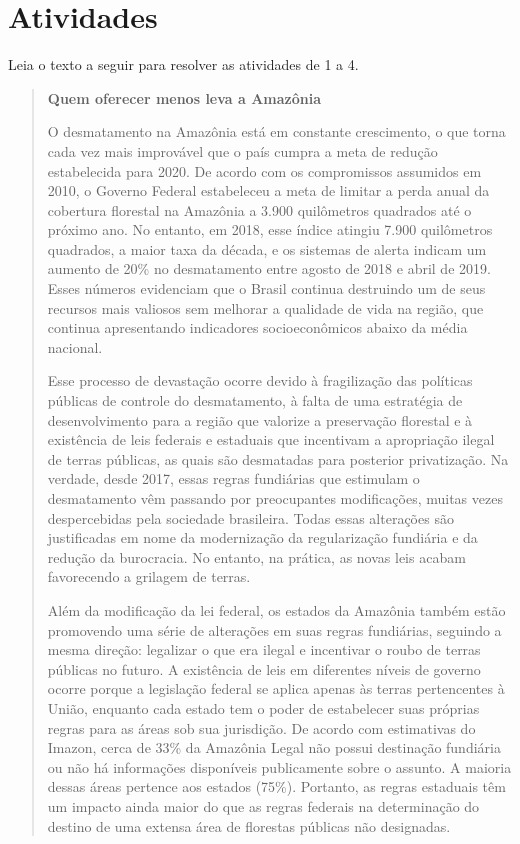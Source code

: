 \section{Atividades}

Leia o texto a seguir para resolver as atividades de 1 a 4.

\begin{quote}
\centering\textbf{Quem oferecer menos leva a Amazônia}


O desmatamento na Amazônia está em constante crescimento, o que torna
cada vez mais improvável que o país cumpra a meta de redução
estabelecida para 2020. De acordo com os compromissos assumidos em 2010,
o Governo Federal estabeleceu a meta de limitar a perda anual da
cobertura florestal na Amazônia a 3.900 quilômetros quadrados até o
próximo ano. No entanto, em 2018, esse índice atingiu 7.900 quilômetros
quadrados, a maior taxa da década, e os sistemas de alerta indicam um
aumento de 20\% no desmatamento entre agosto de 2018 e abril de 2019.
Esses números evidenciam que o Brasil continua destruindo um de seus
recursos mais valiosos sem melhorar a qualidade de vida na região, que
continua apresentando indicadores socioeconômicos abaixo da média
nacional.

Esse processo de devastação ocorre devido à fragilização das políticas
públicas de controle do desmatamento, à falta de uma estratégia de
desenvolvimento para a região que valorize a preservação florestal e à
existência de leis federais e estaduais que incentivam a apropriação
ilegal de terras públicas, as quais são desmatadas para posterior
privatização. Na verdade, desde 2017, essas regras fundiárias que
estimulam o desmatamento vêm passando por preocupantes modificações,
muitas vezes despercebidas pela sociedade brasileira. Todas essas
alterações são justificadas em nome da modernização da regularização
fundiária e da redução da burocracia. No entanto, na prática, as novas
leis acabam favorecendo a grilagem de terras.

Além da modificação da lei federal, os estados da Amazônia também estão
promovendo uma série de alterações em suas regras fundiárias, seguindo a
mesma direção: legalizar o que era ilegal e incentivar o roubo de terras
públicas no futuro. A existência de leis em diferentes níveis de governo
ocorre porque a legislação federal se aplica apenas às terras
pertencentes à União, enquanto cada estado tem o poder de estabelecer
suas próprias regras para as áreas sob sua jurisdição. De acordo com
estimativas do Imazon, cerca de 33\% da Amazônia Legal não possui
destinação fundiária ou não há informações disponíveis publicamente
sobre o assunto. A maioria dessas áreas pertence aos estados (75\%).
Portanto, as regras estaduais têm um impacto ainda maior do que as
regras federais na determinação do destino de uma extensa área de
florestas públicas não designadas.

\end{quote}


